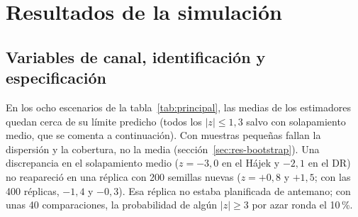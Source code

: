 \section{Resultados de la simulación}\label{sec:resultados}

\subsection{Variables de canal, identificación y especificación}\label{sec:res-principal}

En los ocho escenarios de la tabla~\ref{tab:principal}, las medias de los estimadores quedan cerca de su límite predicho (todos los $|z|\le1,3$ salvo con solapamiento medio, que se comenta a continuación). Con muestras pequeñas fallan la dispersión y la cobertura, no la media (sección~\ref{sec:res-bootstrap}). Una discrepancia en el solapamiento medio ($z=-3,0$ en el Hájek y $-2,1$ en el DR) no reapareció en una réplica con 200 semillas nuevas ($z=+0,8$ y $+1,5$; con las 400 réplicas, $-1,4$ y $-0,3$). Esa réplica no estaba planificada de antemano; con unas 40 comparaciones, la probabilidad de algún $|z|\ge3$ por azar ronda el 10\,\%.

\begin{table}[ht]
\centering\small
\caption{Resultados principales. Tasas en \%; entre paréntesis, $z=$ (media $-$ predicción)/(error de Monte Carlo). DE: desviación típica del DR entre réplicas. Cobertura del intervalo de Wald del DR al 95\,\%, respecto de $\theta$. En los escenarios con $C$, el $\neff/n_0$ teórico se calcula con la parte con soporte; sale prácticamente igual que sin $C$ (0,217), porque $\PP(H=0\mid V,D=1)$ varía poco en la región objetivo.}\label{tab:principal}
\end{table}

